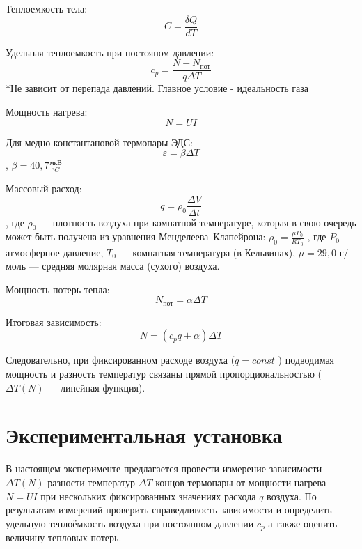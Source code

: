\documentclass[a4paper, 12pt]{article}
\begin{document}
Теплоемкость тела:
\begin{equation}
    C = \frac{\delta Q}{dT}
\end{equation}

Удельная теплоемкость при постояном давлении:
\begin{equation}
    c_p = \frac{N - N_{\text{пот}}}{q \Delta T}
\end{equation}
*Не зависит от перепада давлений. Главное условие - идеальность газа

Мощность нагрева:
\begin{equation}
    N = UI
\end{equation}

Для медно-константановой термопары ЭДС:
\begin{equation}
    \varepsilon = \beta \Delta T
\end{equation}
, $\beta = 40,7 \frac{\text{мкВ}}{^{\circ}C}$

Массовый расход:
\begin{equation}
    q = \rho_{0}  \frac{\Delta V}{\Delta t}
\end{equation}
, где $\rho_0$ — плотность воздуха при комнатной температуре, которая в свою очередь может быть получена из уравнения Менделеева–Клапейрона: $\rho_0 = \frac{\mu P_0}{R T_0}$
,
где $P_0$ — атмосферное давление, $T_0$ — комнатная температура (в Кельвинах), $\mu = 29,0$ г/моль — средняя молярная масса (сухого) воздуха.

Мощность потерь тепла:
\begin{equation}
    N_{\text{пот}} = \alpha \Delta T
\end{equation}

Итоговая зависимость:
\begin{equation}
    N = (c_{p} q + \alpha) \Delta T
\end{equation}

Следовательно, при фиксированном расходе воздуха ($q = const$ ) подводимая мощность и разность температур связаны прямой пропорциональностью
($\Delta T(N)$ — линейная функция).

\section{Экспериментальная установка}

В настоящем эксперименте предлагается провести измерение зависимости
$\Delta T(N)$ разности температур $\Delta T$ концов термопары от мощности нагрева
$N = UI$ при нескольких фиксированных значениях расхода $q$ воздуха. По результатам измерений проверить справедливость зависимости и определить удельную теплоёмкость воздуха при постоянном давлении $c_p$ а также
оценить величину тепловых потерь.
\end{document}
